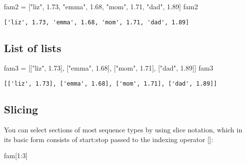 \documentclass[
  letterpaper,
  DIV=11,
  numbers=noendperiod]{scrreprt}
\newenvironment{Shaded}{\begin{snugshade}}{\end{snugshade}}
\newcommand{\DecValTok}[1]{\textcolor[rgb]{0.68,0.00,0.00}{#1}}
\newcommand{\FloatTok}[1]{\textcolor[rgb]{0.68,0.00,0.00}{#1}}
\newcommand{\NormalTok}[1]{\textcolor[rgb]{0.00,0.23,0.31}{#1}}
\newcommand{\OperatorTok}[1]{\textcolor[rgb]{0.37,0.37,0.37}{#1}}
\newcommand{\StringTok}[1]{\textcolor[rgb]{0.13,0.47,0.30}{#1}}
\begin{document}
\begin{Shaded}
\begin{Highlighting}[]
\NormalTok{fam2 }\OperatorTok{=}\NormalTok{ [}\StringTok{"liz"}\NormalTok{, }\FloatTok{1.73}\NormalTok{, }\StringTok{"emma"}\NormalTok{, }\FloatTok{1.68}\NormalTok{, }\StringTok{"mom"}\NormalTok{, }\FloatTok{1.71}\NormalTok{, }\StringTok{"dad"}\NormalTok{, }\FloatTok{1.89}\NormalTok{]}
\NormalTok{fam2}
\end{Highlighting}
\end{Shaded}

\begin{verbatim}
['liz', 1.73, 'emma', 1.68, 'mom', 1.71, 'dad', 1.89]
\end{verbatim}

\hypertarget{list-of-lists}{%
\subsection{List of lists}\label{list-of-lists}}

\begin{Shaded}
\begin{Highlighting}[]
\NormalTok{fam3 }\OperatorTok{=}\NormalTok{ [[}\StringTok{"liz"}\NormalTok{, }\FloatTok{1.73}\NormalTok{],}
\NormalTok{         [}\StringTok{"emma"}\NormalTok{, }\FloatTok{1.68}\NormalTok{],}
\NormalTok{         [}\StringTok{"mom"}\NormalTok{, }\FloatTok{1.71}\NormalTok{],}
\NormalTok{         [}\StringTok{"dad"}\NormalTok{, }\FloatTok{1.89}\NormalTok{]]}
\NormalTok{fam3}
\end{Highlighting}
\end{Shaded}

\begin{verbatim}
[['liz', 1.73], ['emma', 1.68], ['mom', 1.71], ['dad', 1.89]]
\end{verbatim}

\hypertarget{slicing}{%
\subsection{Slicing}\label{slicing}}

You can select sections of most sequence types by using slice notation,
which in its basic form consists of start:stop passed to the indexing
operator {[}{]}:

\begin{Shaded}
\begin{Highlighting}[]
\NormalTok{fam[}\DecValTok{1}\NormalTok{:}\DecValTok{3}\NormalTok{]}
\end{Highlighting}
\end{Shaded}
\end{document}
